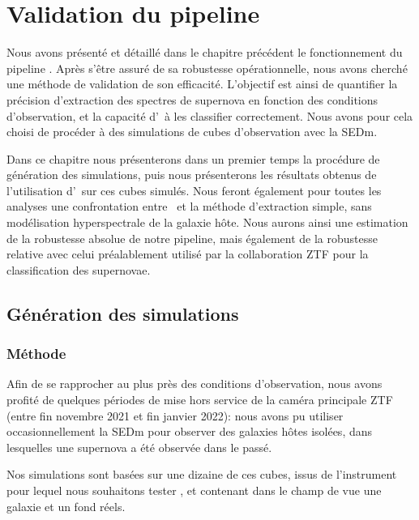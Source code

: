 \documentclass[../main/main.tex]{subfiles}
\begin{document}
\setcounter{chapter}{8}
\chapter{Validation du pipeline
  \hypergal}\label{ch:simu}

\minitoc
\vspace{2cm}
Nous avons présenté et détaillé dans le chapitre précédent le
fonctionnement du pipeline \hypergal. Après s'être assuré de sa
robustesse opérationnelle, nous avons cherché une méthode de validation de son
efficacité. L'objectif est ainsi de quantifier la précision d'extraction
des spectres de supernova en fonction des conditions d'observation, et
la capacité d'\hypergal\ à les classifier correctement.
Nous avons pour cela choisi de procéder à des simulations de cubes
d'observation avec la SEDm.

Dans ce chapitre nous présenterons dans un premier temps la procédure de
génération des simulations, puis nous présenterons les résultats
obtenus de
l'utilisation d'\hypergal\ sur ces cubes simulés. Nous feront également
pour toutes les analyses une confrontation entre \hypergal\ et la
méthode d'extraction simple, sans modélisation hyperspectrale de la
galaxie hôte. Nous aurons ainsi une estimation de la robustesse absolue
de notre pipeline, mais également de la robustesse relative avec celui
préalablement utilisé par la collaboration ZTF pour la classification des supernovae. 
\newpage

\section{Génération des simulations}\label{sec:simugeneration}

\subsection{Méthode}

Afin de se rapprocher au plus près des conditions d'observation, nous
avons profité de quelques périodes de mise hors service de la caméra
principale ZTF (entre fin novembre 2021 et fin janvier 2022): nous avons
pu utiliser occasionnellement la SEDm pour observer des galaxies hôtes isolées, dans
lesquelles une supernova a été observée dans le passé.

Nos simulations sont basées sur une dizaine de ces cubes, issus de
l'instrument pour lequel nous souhaitons tester \hypergal, et
contenant dans le champ de vue une galaxie et un fond réels.
\end{document}
